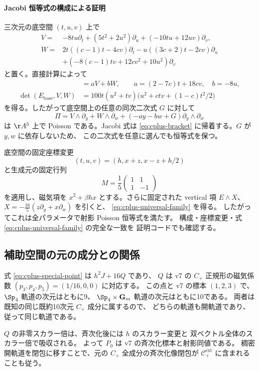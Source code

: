 \paragraph{Jacobi 恒等式の構成による証明}
三次元の底空間 $(t,u,v)$ 上で
\begin{align*}
 V={}&-8tu\partial_t+(5t^2+2u^2)\partial_u
                      +(-10tu+12uv)\partial_v,\\
 W={}&2t((c-1)t-4cv)\partial_t
      -u((3c+2)t-2cv)\partial_u\\
    &+(-8(c-1)tv+12cv^2+10u^2)\partial_v
\end{align*}
と置く。直接計算によって
\begin{align}
 [V,W]&=aV+bW,\qquad a=(2-7c)t+18cv,\quad b=-8u,
 \label{eq:cplus-bracket}\\
 \det(E_{\mathrm{base}},V,W)
 &=100t(u^2+tv)\bigl(u^2+ctv+(1-c)t^2/2\bigr)
 \label{eq:cplus-determinant}
\end{align}
を得る。したがって底空間上の任意の同次二次式 $G$ に対して
\[
 \Pi=V\wedge\partial_y+W\wedge\partial_w
            +(-ay-bw+G)\partial_y\wedge\partial_w
\]
は $\AA^5$ 上で Poisson である。Jacobi 式は
\eqref{eq:cplus-bracket} に帰着する。$G$ が $y,w$ に依存しないため、
この二次式を任意に選んでも恒等式を保つ。

底空間の固定座標変更
\[
 (t,u,v)=(h,x+z,x-z+h/2)
\]
と生成元の固定行列
\[
 M=\frac15\begin{pmatrix}1&1\\1&-1\end{pmatrix}
\]
を適用し、磁気項を $x^2+\beta hx$ とする。さらに固定された vertical 項
$E\wedge X$、$X=-\frac{16}{5}(z\partial_y+x\partial_w)$ を引くと、
\eqref{eq:cplus-universal-family} を得る。
したがってこれは全パラメータで射影 Poisson 恒等式を満たす。
構成・座標変更・式 \eqref{eq:cplus-universal-family} の完全な一致を
証明コードでも確認する。

\subsection{補助空間の元の成分との関係}

式 \eqref{eq:cplus-special-point} は $h^2J+16Q$ であり、
$Q$ は v7 の $C_+$ 正規形の磁気係数
$(p_3,p_4,p_5)=(1/16,0,0)$ に対応する。
この点と v7 の標本 $(1,2,3)$ で、$\Sp_4$ 軌道の次元はともに9、
$\Sp_4\times\mathbf G_m$ 軌道の次元はともに10である。
両者は既知の同じ既約10次元 $C_+$ 成分に属するので、
どちらの軌道も開軌道であり、従って同じ軌道である。

$Q$ の非零スカラー倍は、斉次化後には $h$ のスカラー変更と
双ベクトル全体のスカラー倍で吸収される。
よって $P_0$ は v7 の斉次化標本と射影同値である。
稠密開軌道を閉包に移すことで、元の $C_+$ 全成分の斉次化像閉包が
$\mathcal C_+^{\mathrm{ext}}$ に含まれることも従う。

